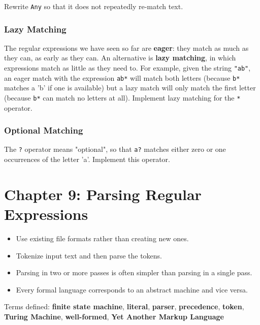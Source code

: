 \documentclass{scrbook}
\newcommand{\glossref}[1]{\textbf{#1}}
\begin{document}
Rewrite \texttt{Any} so that it does not repeatedly re-match text.

\subsection*{Lazy Matching}


The regular expressions we have seen so far are \glossref{eager}:
they match as much as they can, as early as they can.
An alternative is \glossref{lazy matching},
in which expressions match as little as they need to.
For example,
given the string \texttt{"ab"},
an eager match with the expression \texttt{ab*} will match both letters
(because \texttt{b*} matches a 'b' if one is available)
but a lazy match will only match the first letter
(because \texttt{b*} can match no letters at all).
Implement lazy matching for the \texttt{*} operator.

\subsection*{Optional Matching}


The \texttt{?} operator means "optional",
so that \texttt{a?} matches either zero or one occurrences of the letter 'a'.
Implement this operator.

\chapter{Chapter 9: Parsing Regular Expressions}\label{parser}

\begin{itemize}

\item Use existing file formats rather than creating new ones.

\item Tokenize input text and then parse the tokens.

\item Parsing in two or more passes is often simpler than parsing in a single pass.

\item Every formal language corresponds to an abstract machine and vice versa.

\end{itemize}


\noindent 
    Terms defined:
    \glossref{finite state machine}, \glossref{literal}, \glossref{parser}, \glossref{precedence}, \glossref{token}, \glossref{Turing Machine}, \glossref{well-formed}, \glossref{Yet Another Markup Language}
\end{document}
